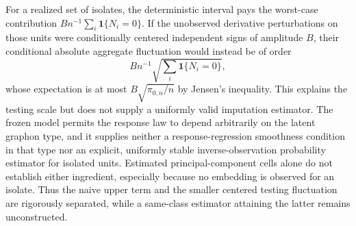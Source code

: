 For a realized set of isolates, the deterministic interval pays the worst-case contribution \(Bn^{-1}\sum_i\mathbf 1\{N_i=0\}\).  If the unobserved derivative perturbations on those units were conditionally centered independent signs of amplitude \(B\), their conditional absolute aggregate fluctuation would instead be of order
\[
 Bn^{-1}\sqrt{\sum_i\mathbf 1\{N_i=0\}},
\]
whose expectation is at most \(B\sqrt{\pi_{0,n}/n}\) by Jensen's inequality.  This explains the testing scale but does not supply a uniformly valid imputation estimator.  The frozen model permits the response law to depend arbitrarily on the latent graphon type, and it supplies neither a response-regression smoothness condition in that type nor an explicit, uniformly stable inverse-observation probability estimator for isolated units.  Estimated principal-component cells alone do not establish either ingredient, especially because no embedding is observed for an isolate.  Thus the naive upper term and the smaller centered testing fluctuation are rigorously separated, while a same-class estimator attaining the latter remains unconstructed.